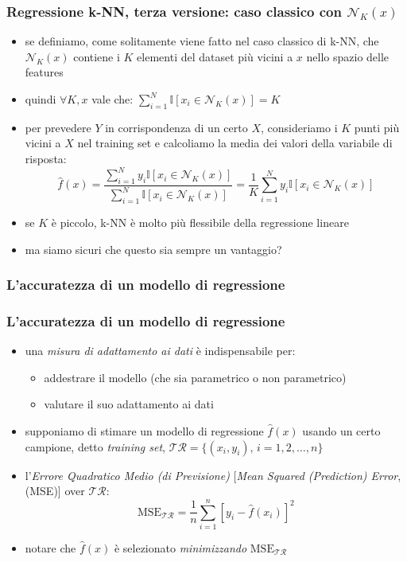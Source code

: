 \begin{frame}

	\frametitle{Regressione k-NN, terza versione: caso classico con $\mathcal{N}_K(x)$}

	\begin{itemize}
		\item se definiamo, come solitamente viene fatto nel caso classico di k-NN, che $\mathcal{N}_K(x)$ contiene i $K$ elementi del dataset più vicini a $x$ nello spazio delle features
		\item quindi $\forall K, x$ vale che: $\sum_{i=1}^N \mathbb{I}[x_i\in\mathcal{N}_K(x)] = K$
		\item per prevedere $Y$ in corrispondenza di un certo $X$, consideriamo i $K$ punti più vicini a $X$ nel training set e calcoliamo la media dei valori della variabile di risposta:
			\[
				\widehat f(x) = \frac{\sum_{i=1}^N y_i \mathbb{I}[x_i\in\mathcal{N}_K(x)]}{\sum_{i=1}^N \mathbb{I}[x_i\in\mathcal{N}_K(x)]} = \frac{1}{K} \sum_{i=1}^N y_i \mathbb{I}[x_i\in\mathcal{N}_K(x)]
			\]
		\item se $K$ è piccolo, k-NN è molto più flessibile della regressione lineare
		\item ma siamo sicuri che questo sia sempre un vantaggio?
	\end{itemize}
\end{frame}



\subsubsection[L'accuratezza di un modello di regressione]{L'accuratezza di un modello di regressione}

\begin{frame}
	\frametitle{L'accuratezza di un modello di regressione}
	\begin{itemize}
		\item una \emph{misura di adattamento ai dati} è indispensabile per: 
			\begin{itemize}
				\item addestrare il modello (che sia parametrico o non parametrico)
				\item valutare il suo adattamento ai dati
			\end{itemize}
		\item supponiamo di stimare un modello di regressione $\widehat f(x)$ usando un certo campione, detto \emph{training set}, $\mathcal{TR}=\{(x_i,y_i),\,i=1,2,\ldots,n\}$
		\item l'\emph{Errore Quadratico Medio (di Previsione)} [\emph{Mean Squared (Prediction) Error}, (MSE)] over $\mathcal{TR}$:
			\[
				\mbox{MSE}_{\mathcal{TR}} = \frac{1}{n} \sum_{i=1}^n [y_i-\widehat f(x_i)]^2
			\]
		\item notare che $\widehat{f}(x)$ è selezionato \emph{minimizzando} $\mbox{MSE}_{\mathcal{TR}}$
	\end{itemize}
\end{frame}



